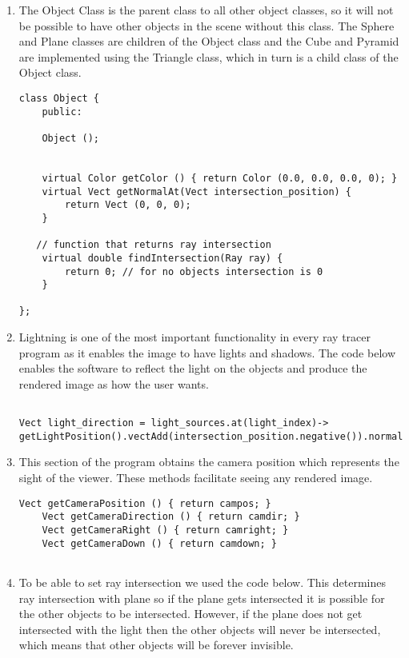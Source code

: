 \documentclass{article}
\begin{document}
\begin{enumerate}
\item The Object Class is the parent class to all other object classes, so it will not be possible to have other objects in the scene without this class. The Sphere and Plane classes are children of the Object class and the Cube and Pyramid are implemented using the Triangle class, which in turn is a child class of the Object class.

\begin{lstlisting}
class Object {
    public: 

    Object (); 

    
    virtual Color getColor () { return Color (0.0, 0.0, 0.0, 0); } 
    virtual Vect getNormalAt(Vect intersection_position) {
        return Vect (0, 0, 0);
    }

   // function that returns ray intersection
    virtual double findIntersection(Ray ray) {
        return 0; // for no objects intersection is 0
    }

}; \end{lstlisting}

\item Lightning is one of the most important functionality in every ray tracer program as it enables the image to have lights and shadows. The code below enables the software to reflect the light on the objects and produce the rendered image as how the user wants.

\begin{lstlisting}

Vect light_direction = light_sources.at(light_index)->
getLightPosition().vectAdd(intersection_position.negative()).normalize(); 

\end{lstlisting}

\item This section of the program obtains the camera position which represents the sight of the viewer. These methods facilitate seeing any rendered image. 

\begin{lstlisting}
Vect getCameraPosition () { return campos; }
    Vect getCameraDirection () { return camdir; }
    Vect getCameraRight () { return camright; }
    Vect getCameraDown () { return camdown; }
    
 \end{lstlisting}
 
 \item To be able to set ray intersection we used the code below. This determines ray intersection with plane so if the plane gets intersected it is possible for the other objects to be intersected. However, if the plane does not get intersected with the light then the other objects will never be intersected, which means that other objects will be forever invisible.
 

\end{enumerate}
\end{document}
